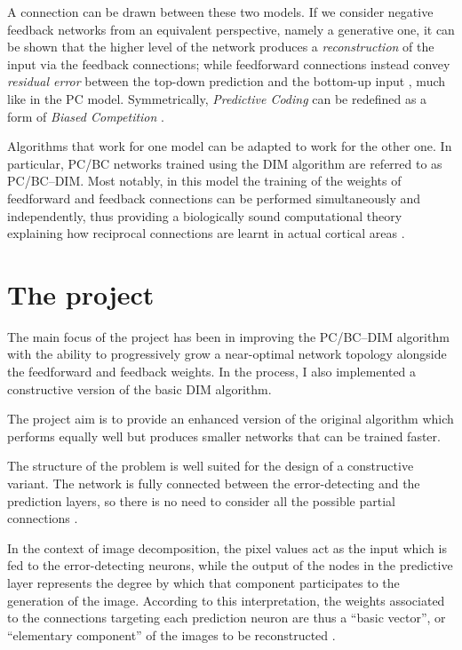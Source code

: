 \documentclass[11pt,a4paper]{report}
\newcommand{\quot}[1]{``#1''}
\begin{document}
			A connection can be drawn between these two models. If we consider negative feedback networks from an equivalent perspective, namely a generative one, it can be shown that the higher level of the network produces a \emph{reconstruction} of the input via the feedback connections; while feedforward connections instead convey \emph{residual error} between the top-down prediction and the bottom-up input \cite{spratling2009unsupervised}, much like in the PC model. Symmetrically, \emph{Predictive Coding} can be redefined as a form of \emph{Biased Competition} \cite{spratling2008predictive,spratling2008reconciling}.
		
			Algorithms that work for one model can be adapted to work for the other one. In particular, PC/BC networks trained using the DIM algorithm are referred to as PC/BC--DIM. Most notably, in this model the training of the weights of feedforward and feedback connections can be performed simultaneously and independently, thus providing a biologically sound computational theory explaining how reciprocal connections are learnt in actual cortical areas \cite{callaway1998local,spratling2012unsupervised}.
		
		\section{The project}
			The main focus of the project has been in improving the PC/BC--DIM algorithm with the ability to progressively grow a near-optimal network topology alongside the feedforward and feedback weights. In the process, I also implemented a constructive version of the basic DIM algorithm.
		
			The project aim is to provide an enhanced version of the original algorithm which performs equally well but produces smaller networks that can be trained faster.
		
			The structure of the problem is well suited for the design of a constructive variant. The network is fully connected between the error-detecting and the prediction layers, so there is no need to consider all the possible partial connections \cite{?}.
		
			In the context of image decomposition, the pixel values act as the input which is fed to the error-detecting neurons, while the output of the nodes in the predictive layer represents the degree by which that component participates to the generation of the image. According to this interpretation, the weights associated to the connections targeting each prediction neuron are thus a \quot{basic vector}, or \quot{elementary component} of the images to be reconstructed \cite{spratling2014predictive}.
\end{document}
